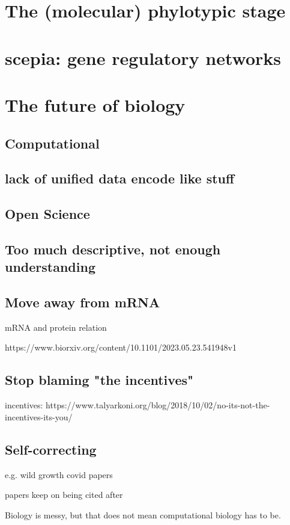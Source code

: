 \section{The (molecular) phylotypic stage}

\section{scepia: gene regulatory networks}

\section{The future of biology}

\subsection{Computational}
\subsection{lack of unified data encode like stuff}

\subsection{Open Science}

\subsection{Too much descriptive, not enough understanding}

\subsection{Move away from mRNA}

mRNA and protein relation

https://www.biorxiv.org/content/10.1101/2023.05.23.541948v1

\subsection{Stop blaming "the incentives"}

incentives: https://www.talyarkoni.org/blog/2018/10/02/no-its-not-the-incentives-its-you/

\subsection{Self-correcting}

e.g. wild growth covid papers

papers keep on being cited after 


Biology is messy, but that does not mean computational biology has to be.
